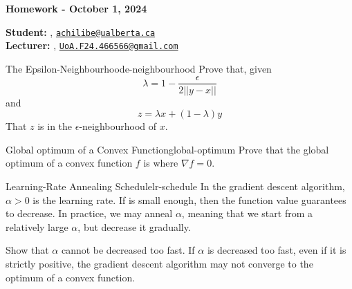 





\begin{Large}
    \textsf{\textbf{Homework - October 1, 2024}}
\end{Large}

\vspace{1ex}

\textsf{\textbf{Student:}} , \href{mailto:achilibe@ualberta.ca}{\texttt{achilibe@ualberta.ca}}\\
\textsf{\textbf{Lecturer:}} , \href{mailto:UoA.F24.466566@gmail.com}{\texttt{UoA.F24.466566@gmail.com}}


\vspace{2ex}

\begin{problem}{The Epsilon-Neighbourhood}{e-neighbourhood}
Prove that, given
\begin{equation*}
  \lambda = 1-\frac{\epsilon}{2||y-x||}
\end{equation*}
and
\begin{equation*}
  z = \lambda x + (1-\lambda)y
\end{equation*}
That $z$ is in the $\epsilon$-neighbourhood of $x$.
\end{problem}



\begin{problem}{Global optimum of a Convex Function}{global-optimum}
Prove that the global optimum of a convex function $f$ is where $\nabla f = 0$.
\end{problem}



\begin{problem}{Learning-Rate Annealing Schedule}{lr-schedule}
 In the gradient descent algorithm, $\alpha >0$ is the learning rate. If  is small enough, then the function value guarantees to decrease. In practice, we may anneal $\alpha$, meaning that we start from a relatively large $\alpha$, but decrease it gradually.

Show that $\alpha$ cannot be decreased too fast. If $\alpha$ is decreased too fast, even if it is strictly positive, the gradient descent algorithm may not converge to the optimum of a convex function.
\end{problem}










